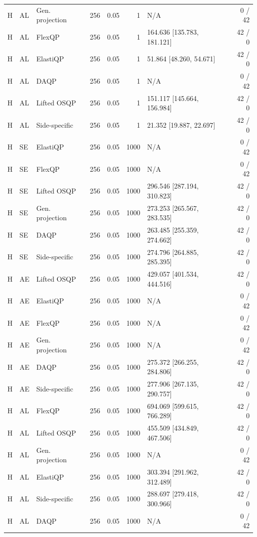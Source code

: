 \begin{longtable}{@{}lllrrrlr@{}}
H & AL & Gen. projection & 256 & 0.05 & 1 & N/A & 0 / 42 \\
H & AL & FlexQP & 256 & 0.05 & 1 & 164.636 [135.783, 181.121] & 42 / 0 \\
H & AL & ElastiQP & 256 & 0.05 & 1 & 51.864 [48.260, 54.671] & 42 / 0 \\
H & AL & DAQP & 256 & 0.05 & 1 & N/A & 0 / 42 \\
H & AL & Lifted OSQP & 256 & 0.05 & 1 & 151.117 [145.664, 156.984] & 42 / 0 \\
H & AL & Side-specific & 256 & 0.05 & 1 & 21.352 [19.887, 22.697] & 42 / 0 \\
H & SE & ElastiQP & 256 & 0.05 & 1000 & N/A & 0 / 42 \\
H & SE & FlexQP & 256 & 0.05 & 1000 & N/A & 0 / 42 \\
H & SE & Lifted OSQP & 256 & 0.05 & 1000 & 296.546 [287.194, 310.823] & 42 / 0 \\
H & SE & Gen. projection & 256 & 0.05 & 1000 & 273.253 [265.567, 283.535] & 42 / 0 \\
H & SE & DAQP & 256 & 0.05 & 1000 & 263.485 [255.359, 274.662] & 42 / 0 \\
H & SE & Side-specific & 256 & 0.05 & 1000 & 274.796 [264.885, 285.395] & 42 / 0 \\
H & AE & Lifted OSQP & 256 & 0.05 & 1000 & 429.057 [401.534, 444.516] & 42 / 0 \\
H & AE & ElastiQP & 256 & 0.05 & 1000 & N/A & 0 / 42 \\
H & AE & FlexQP & 256 & 0.05 & 1000 & N/A & 0 / 42 \\
H & AE & Gen. projection & 256 & 0.05 & 1000 & N/A & 0 / 42 \\
H & AE & DAQP & 256 & 0.05 & 1000 & 275.372 [266.255, 284.806] & 42 / 0 \\
H & AE & Side-specific & 256 & 0.05 & 1000 & 277.906 [267.135, 290.757] & 42 / 0 \\
H & AL & FlexQP & 256 & 0.05 & 1000 & 694.069 [599.615, 766.289] & 42 / 0 \\
H & AL & Lifted OSQP & 256 & 0.05 & 1000 & 455.509 [434.849, 467.506] & 42 / 0 \\
H & AL & Gen. projection & 256 & 0.05 & 1000 & N/A & 0 / 42 \\
H & AL & ElastiQP & 256 & 0.05 & 1000 & 303.394 [291.962, 312.489] & 42 / 0 \\
H & AL & Side-specific & 256 & 0.05 & 1000 & 288.697 [279.418, 300.966] & 42 / 0 \\
H & AL & DAQP & 256 & 0.05 & 1000 & N/A & 0 / 42 \\

\end{longtable}
